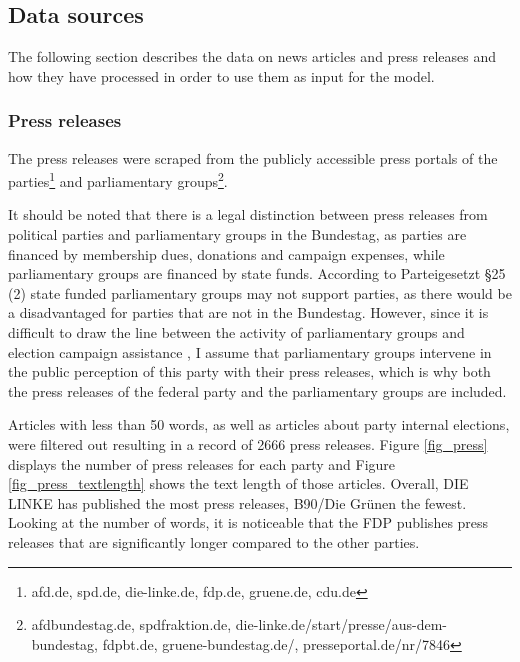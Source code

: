 \documentclass[12pt,a4paper,notitlepage]{article}
\begin{document}
\subsection{Data sources}\label{ch_data}

The following section describes the data on news articles and press releases and how they have processed in order to use them as input for the model.

\subsubsection{Press releases}\label{ch_press}

The press releases were scraped from the publicly accessible press portals of the parties\footnote{afd.de, spd.de, die-linke.de, fdp.de, gruene.de, cdu.de} and parliamentary groups\footnote{afdbundestag.de, spdfraktion.de, die-linke.de/start/presse/aus-dem-bundestag, fdpbt.de, gruene-bundestag.de/, presseportal.de/nr/7846}. 

It should be noted that there is a legal distinction between press releases from political parties and parliamentary groups in the Bundestag, as parties are financed by membership dues, donations and campaign expenses, while parliamentary groups are financed by state funds. According to Parteigesetzt §25 (2) state funded parliamentary groups may not support parties, as there would be a disadvantaged for parties that are not in the Bundestag. However, since it is difficult to draw the line between the activity of parliamentary groups and election campaign assistance \citep{kepplinger_einfluss_2004}, I assume that parliamentary groups intervene in the public perception of this party with their press releases, which is why both the press releases of the federal party and the parliamentary groups are included.

Articles with less than 50 words, as well as articles about party internal elections, were filtered out resulting in a record of 2666 press releases. Figure \ref{fig_press} displays the number of press releases for each party and Figure \ref{fig_press_textlength} shows the text length of those articles. Overall, DIE LINKE has published the most press releases, B90/Die Grünen the fewest. Looking at the number of words, it is noticeable that the FDP publishes press releases that are significantly longer compared to the other parties.
\end{document}
